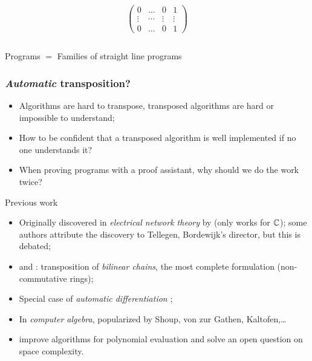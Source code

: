 \documentclass[10pt]{beamer}
\begin{document}
\begin{frame}[fragile]
\begin{columns}
    \begin{column}{0.5\textwidth}
      \begin{equation*}
        \begin{pmatrix}
          0 & \hdots & 0 & 1\\
          \vdots  &  \cdots & \vdots & \vdots \\
          0 & \hdots & 0 & 1
        \end{pmatrix}
      \end{equation*}
    \end{column}
  \end{columns}

  \begin{center}
    \large
    Programs $=$ Families of straight line programs
  \end{center}
\end{frame}


\begin{frame}
  \frametitle{\emph{Automatic} transposition?}

  \begin{itemize}
  \item Algorithms are hard to transpose, transposed algorithms are
    hard or impossible to understand;
  \item How to be confident that a transposed algorithm is well
    implemented if no one understands it?
  \item When proving programs with a proof assistant, why should we do
    the work twice?
  \end{itemize}

  \begin{block}{Previous work}
    \begin{itemize}
    \item Originally discovered in \emph{electrical network theory} by
      \cite{bordewijk57} (only works for $\mathbb{C}$); some authors attribute
      the discovery to Tellegen, Bordewijk's director, but this is
      debated;
    \item \cite{fiduccia:phd} and \cite{hopcroft+musinski73}:
      transposition of \emph{bilinear chains}, the most complete
      formulation (non-commutative rings);
    \item Special case of \emph{automatic differentiation}
      \cite{baur+strassen83};
    \item In \emph{computer algebra}, popularized by Shoup, von zur
      Gathen, Kaltofen,\dots
    \item \cite{bostan+lecerf+schost:tellegen} improve algorithms for
      polynomial evaluation and solve an open question on space
      complexity.
    \end{itemize}
  \end{block}
\end{frame}
\end{document}

